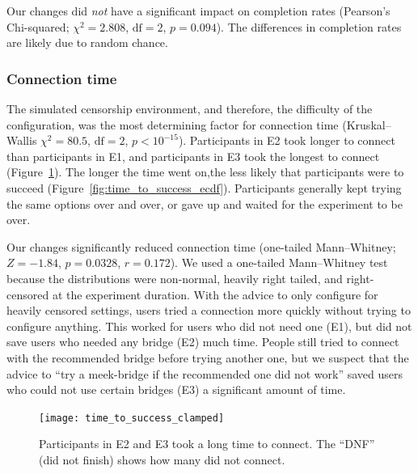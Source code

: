 \documentclass[USenglish,oneside,twocolumn]{article}
\begin{document}
Our changes did {\it not} have a significant impact on completion rates (Pearson's Chi-squared; $\chi^2 = 2.808$, $\mbox{df} = 2$, $p = 0.094$). The differences in completion rates are likely due to random chance.


\subsubsection{Connection time} 
The simulated censorship environment, and therefore, the difficulty of the configuration, was the most determining factor for connection time (Kruskal--Wallis $\chi^2 = 80.5$, $\mbox{df} = 2$, $p < 10^{-15}$). Participants in E2 took longer to connect than participants in E1, and participants in E3 took the longest to connect (Figure~\ref{fig:time_to_success_clamped}). The longer the time went on,the less likely that participants were to succeed (Figure~\ref{fig:time_to_success_ecdf}). Participants generally kept trying the same options over and over, or gave up and waited for the experiment to be over. 

Our changes significantly reduced connection time (one-tailed Mann--Whitney; $ Z = -1.84$, $p = 0.0328$, $r= 0.172$). We used a one-tailed Mann--Whitney test because the distributions were non-normal, heavily right tailed, and right-censored at the experiment duration. With the advice to only configure for heavily censored settings, users  tried a connection more quickly without trying to configure anything. This worked for users who did not need one (E1), but did not save users who needed any bridge (E2) much time. People still tried to connect with the recommended bridge before trying another one, but we suspect that the advice to ``try a meek-bridge if the recommended one did not work'' saved users who could not use certain bridges (E3) a significant amount of time. 

\begin{figure}[t]
\centering
\texttt{[image: time\_to\_success\_clamped]}
\caption{
Participants in E2 and E3 took a long time to connect.
The ``DNF'' (did not finish) shows how many did not connect.}
\label{fig:time_to_success_clamped}
\end{figure}
\end{document}
